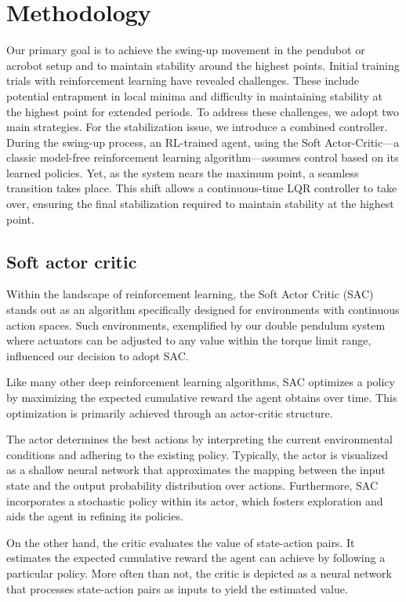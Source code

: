 \chapter{Methodology}
Our primary goal is to achieve the swing-up movement in the pendubot or acrobot setup and to maintain stability around the highest points. Initial training trials with reinforcement learning have revealed challenges. These include potential entrapment in local minima and difficulty in maintaining stability at the highest point for extended periods. To address these challenges, we adopt two main strategies. For the stabilization issue, we introduce a combined controller. During the swing-up process, an RL-trained agent, using the Soft Actor-Critic—a classic model-free reinforcement learning algorithm—assumes control based on its learned policies. Yet, as the system nears the maximum point, a seamless transition takes place. This shift allows a continuous-time LQR controller to take over, ensuring the final stabilization required to maintain stability at the highest point.

\section{Soft actor critic}
Within the landscape of reinforcement learning, the Soft Actor Critic (SAC) stands out as an algorithm specifically designed for environments with continuous action spaces. Such environments, exemplified by our double pendulum system where actuators can be adjusted to any value within the torque limit range, influenced our decision to adopt SAC.

Like many other deep reinforcement learning algorithms, SAC optimizes a policy by maximizing the expected cumulative reward the agent obtains over time. This optimization is primarily achieved through an actor-critic structure.

The actor determines the best actions by interpreting the current environmental conditions and adhering to the existing policy. Typically, the actor is visualized as a shallow neural network that approximates the mapping between the input state and the output probability distribution over actions. Furthermore, SAC incorporates a stochastic policy within its actor, which fosters exploration and aids the agent in refining its policies.

On the other hand, the critic evaluates the value of state-action pairs. It estimates the expected cumulative reward the agent can achieve by following a particular policy. More often than not, the critic is depicted as a neural network that processes state-action pairs as inputs to yield the estimated value.

